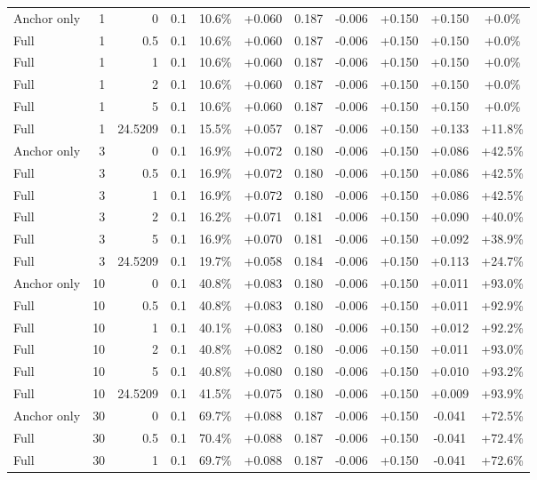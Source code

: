 \begin{table}[htbp]
\begin{tabular}{lrrrccccccc}
Anchor only & 1 & 0 & 0.1 & 10.6\% & +0.060 & 0.187 & -0.006 & +0.150 & +0.150 & +0.0\% \\
Full & 1 & 0.5 & 0.1 & 10.6\% & +0.060 & 0.187 & -0.006 & +0.150 & +0.150 & +0.0\% \\
Full & 1 & 1 & 0.1 & 10.6\% & +0.060 & 0.187 & -0.006 & +0.150 & +0.150 & +0.0\% \\
Full & 1 & 2 & 0.1 & 10.6\% & +0.060 & 0.187 & -0.006 & +0.150 & +0.150 & +0.0\% \\
Full & 1 & 5 & 0.1 & 10.6\% & +0.060 & 0.187 & -0.006 & +0.150 & +0.150 & +0.0\% \\
Full & 1 & 24.5209 & 0.1 & 15.5\% & +0.057 & 0.187 & -0.006 & +0.150 & +0.133 & +11.8\% \\
Anchor only & 3 & 0 & 0.1 & 16.9\% & +0.072 & 0.180 & -0.006 & +0.150 & +0.086 & +42.5\% \\
Full & 3 & 0.5 & 0.1 & 16.9\% & +0.072 & 0.180 & -0.006 & +0.150 & +0.086 & +42.5\% \\
Full & 3 & 1 & 0.1 & 16.9\% & +0.072 & 0.180 & -0.006 & +0.150 & +0.086 & +42.5\% \\
Full & 3 & 2 & 0.1 & 16.2\% & +0.071 & 0.181 & -0.006 & +0.150 & +0.090 & +40.0\% \\
Full & 3 & 5 & 0.1 & 16.9\% & +0.070 & 0.181 & -0.006 & +0.150 & +0.092 & +38.9\% \\
Full & 3 & 24.5209 & 0.1 & 19.7\% & +0.058 & 0.184 & -0.006 & +0.150 & +0.113 & +24.7\% \\
Anchor only & 10 & 0 & 0.1 & 40.8\% & +0.083 & 0.180 & -0.006 & +0.150 & +0.011 & +93.0\% \\
Full & 10 & 0.5 & 0.1 & 40.8\% & +0.083 & 0.180 & -0.006 & +0.150 & +0.011 & +92.9\% \\
Full & 10 & 1 & 0.1 & 40.1\% & +0.083 & 0.180 & -0.006 & +0.150 & +0.012 & +92.2\% \\
Full & 10 & 2 & 0.1 & 40.8\% & +0.082 & 0.180 & -0.006 & +0.150 & +0.011 & +93.0\% \\
Full & 10 & 5 & 0.1 & 40.8\% & +0.080 & 0.180 & -0.006 & +0.150 & +0.010 & +93.2\% \\
Full & 10 & 24.5209 & 0.1 & 41.5\% & +0.075 & 0.180 & -0.006 & +0.150 & +0.009 & +93.9\% \\
Anchor only & 30 & 0 & 0.1 & 69.7\% & +0.088 & 0.187 & -0.006 & +0.150 & -0.041 & +72.5\% \\
Full & 30 & 0.5 & 0.1 & 70.4\% & +0.088 & 0.187 & -0.006 & +0.150 & -0.041 & +72.4\% \\
Full & 30 & 1 & 0.1 & 69.7\% & +0.088 & 0.187 & -0.006 & +0.150 & -0.041 & +72.6\% \\

\end{tabular}
\end{table}
